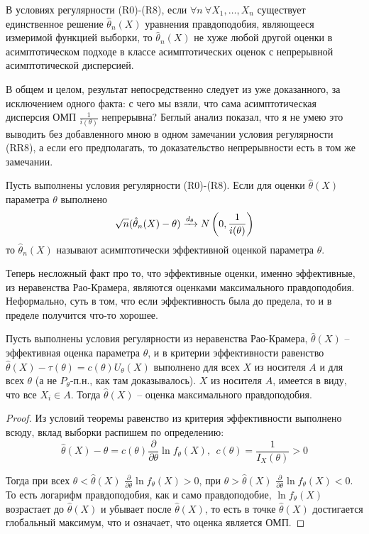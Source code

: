 \begin{corollary}
    В условиях регулярности (R0)-(R8), если $\forall n \ \forall X_1, \dots, X_n$ существует единственное решение $\hat{\theta}_n(X)$ уравнения правдоподобия, являющееся измеримой функцией выборки, то $\hat{\theta}_n(X)$ не хуже любой другой оценки в асимптотическом подходе в классе асимптотических оценок с непрерывной асимптотической дисперсией.
\end{corollary}

\begin{note}
    В общем и целом, результат непосредственно следует из уже доказанного, за исключением одного факта: с чего мы взяли, что сама асимптотическая дисперсия ОМП $\frac{1}{i(\theta)}$ непрерывна? Беглый анализ показал, что я не умею это выводить без добавленного мною в одном замечании условия регулярности (RR8), а если его предполагать, то доказательство непрерывности есть в том же замечании.
\end{note}

\begin{definition}
    Пусть выполнены условия регулярности (R0)-(R8). Если для оценки $\hat{\theta}(X)$ параметра $\theta$ выполнено
    \[
        \sqrt{n}(\hat{\theta}_n(X) - \theta) \xrightarrow{d_\theta} N\left(0, \frac{1}{i(\theta)}\right)
    \]
    то $\hat{\theta}_n(X)$ называют асимптотически эффективной оценкой параметра $\theta$.
\end{definition}

\begin{note}
    Теперь несложный факт про то, что эффективные оценки, именно эффективные, из неравенства Рао-Крамера, являются оценками максимального правдоподобия. Неформально, суть в том, что если эффективность была до предела, то и в пределе получится что-то хорошее.
\end{note}

\begin{proposition}
    Пусть выполнены условия регулярности из неравенства Рао-Крамера, $\hat{\theta}(X)$ -- эффективная оценка параметра $\theta$, и в критерии эффективности равенство $\hat{\theta}(X) - \tau(\theta) = c(\theta) U_\theta(X)$ выполнено для всех $X$ из носителя $A$ и для всех $\theta$ (а не $P_\theta$-п.н., как там доказывалось). $X$ из носителя $A$, имеется в виду, что все $X_i \in A$. Тогда $\hat{\theta}(X)$ -- оценка максимального правдоподобия.
\end{proposition}

\begin{proof}
    Из условий теоремы равенство из критерия эффективности выполнено всюду, вклад выборки распишем по определению:
    \[
        \hat{\theta}(X) - \theta = c(\theta) \frac{\partial}{\partial \theta} \ln f_{\theta}(X),\ \ c(\theta) = \frac{1}{I_X(\theta)} > 0
    \]

    Тогда при всех $\theta < \hat{\theta}(X)$ $\frac{\partial}{\partial \theta} \ln f_{\theta}(X) > 0$, при $\theta > \hat{\theta}(X)$ $\frac{\partial}{\partial \theta} \ln f_{\theta}(X) < 0$. То есть логарифм правдоподобия, как и само правдоподобие, $\ln f_\theta(X)$ возрастает до $\hat{\theta}(X)$ и убывает после $\hat{\theta}(X)$, то есть в точке $\hat{\theta}(X)$ достигается глобальный максимум, что и означает, что оценка является ОМП.
\end{proof}